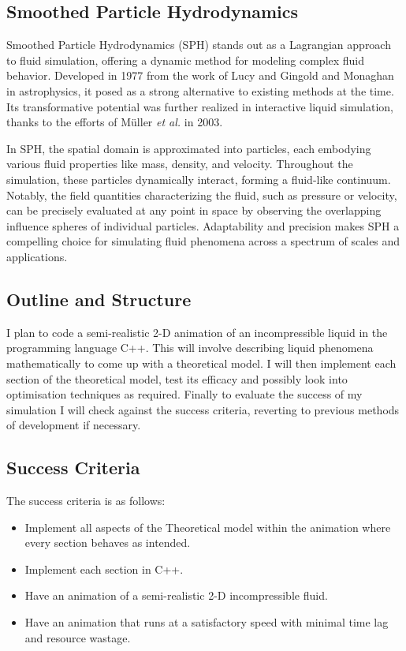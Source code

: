 \documentclass[write-up.tex]{subfiles}
\begin{document}
\subsection{Smoothed Particle Hydrodynamics}
Smoothed Particle Hydrodynamics (SPH) stands out as a Lagrangian approach to fluid simulation, offering a dynamic method for modeling complex fluid behavior. Developed in 1977 from the work of Lucy \cite{lucy} and Gingold and Monaghan \cite{gingold} in astrophysics, it posed as a strong alternative to existing methods at the time. Its transformative potential was further realized in interactive liquid simulation, thanks to the efforts of Müller \textit{et al.} \cite{muller} in 2003.

In SPH, the spatial domain is approximated into particles, each embodying various fluid properties like mass, density, and velocity. Throughout the simulation, these particles dynamically interact, forming a fluid-like continuum. Notably, the field quantities characterizing the fluid, such as pressure or velocity, can be precisely evaluated at any point in space by observing the overlapping influence spheres of individual particles. Adaptability and precision makes SPH a compelling choice for simulating fluid phenomena across a spectrum of scales and applications.

\subsection{Outline and Structure}
I plan to code a semi-realistic 2-D animation of an incompressible liquid in the programming language C++. This will involve describing liquid phenomena mathematically to come up with a theoretical model. I will then implement each section of the theoretical model, test its efficacy and possibly look into optimisation techniques as required. Finally to evaluate the success of my simulation I will check against the success criteria, reverting to previous methods of development if necessary.

\subsection{Success Criteria}
The success criteria is as follows:
\begin{itemize}
 \item Implement all aspects of the Theoretical model within the animation where every section behaves as intended.
 \item Implement each section in C++.
 \item Have an animation of a semi-realistic 2-D incompressible fluid.
 \item Have an animation that runs at a satisfactory speed with minimal time lag and resource wastage.
\end{itemize}
\end{document}
